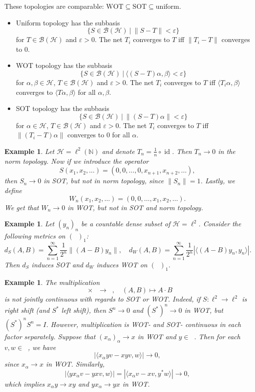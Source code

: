 \documentclass[10pt, a4paper]{article}
\newtheorem{example}[thm]{Example}
\newcommand{\N}{\mathbb {N}}
\DeclareMathOperator{\id}{id}
\DeclareMathOperator{\bh}{\mathcal{B} (\mathcal{H})}
\begin{document}
These topologies are comparable: $\mathrm{WOT} \subseteq \mathrm{SOT} \subseteq \mathrm{uniform}$.
\begin{itemize}
  \item Uniform topology has the subbasis $$\{S \in \mathcal{B}(\mathcal{H})\ |\ \| S - T\| < \varepsilon \}$$
for $T \in \mathcal{B}(\mathcal{H})$ and $\varepsilon > 0$. The net $T_i$ converges to $T$ iff $\| T_i - T\|$ converges to $0$.
  \item WOT topology has the subbasis $$\{S \in \mathcal{B}(\mathcal{H})\ |\ \langle (S - T) \alpha, \beta \rangle < \varepsilon \}$$
  for $\alpha, \beta \in \mathcal{H}$, $T \in \mathcal{B}(\mathcal{H})$ and $\varepsilon > 0$. The net $T_i$ converges to $T$ iff $\langle T_i \alpha, \beta \rangle$ converges to $\langle T \alpha, \beta \rangle$ for all $\alpha, \beta$.
  \item SOT topology has the subbasis $$\{S \in \mathcal{B}(\mathcal{H})\ |\ \| (S - T) \alpha\| < \varepsilon \}$$
  for $\alpha \in \mathcal{H}$, $T \in \mathcal{B}(\mathcal{H})$ and $\varepsilon > 0$. The net $T_i$ converges to $T$ iff $\| (T_i - T)\alpha \|$ converges to $0$ for all $\alpha$.
\end{itemize}

\begin{example}
  Let $\mathcal{H} = \ell^2 (\N)$ and denote $T_n = \frac{1}{n} \circ \id$.
  Then $T_n \to 0$ in the norm topology. Now if we introduce the operator
  $$S (x_1, x_2, \dots) = (0, 0, \dots, 0, x_{n + 1}, x_{n + 2}, \dots),$$
  then $S_n \to 0$ in SOT, but not in norm topology, since $\|S_n\| = 1$.
  Lastly, we define 
  $$W_n (x_1, x_2, \dots) = (0, 0, \dots, x_1, x_2, \dots).$$
  We get that $W_n \to 0$ in WOT, but not in SOT and norm topology.
\end{example}

\begin{example}
  Let $(y_n)_n$ be a countable dense subset of $\mathcal{H} = \ell^2$.
  Consider the following metrics on $(\bh)_1$:
  $$d_S (A, B) = \sum_{n = 1} ^\infty \frac{1}{2^n} \|(A - B) {y_n}\|,\quad d_W (A, B) = \sum_{n = 1} ^\infty \frac{1}{2^n} \left|\langle(A - B) {y_n} , y_n\rangle\right|.$$
  Then $d_S$ induces SOT and $d_W$ induces WOT on $(\bh)_1$.
\end{example}

\begin{example}
  The multiplication 
  $$\bh \times \bh \to \bh,\quad (A, B) \mapsto A \cdot B$$
  is not jointly continuous with regards to SOT or WOT. Indeed, if $S: \ell^2 \to \ell^2$ is right shift (and $S^*$ left shift),
  then $S^n \to 0$ and $(S^*)^n \to 0$ in WOT, but $(S^*)^n S^n = I$. However,
  multiplication is WOT- and SOT- continuous in each factor separately.
  Suppose that $(x_\alpha)_\alpha \to x$ in WOT and $y \in \bh$.
  Then for each $v, w \in \bh$, we have 
  $$|\langle x_\alpha yv - xyv, w \rangle | \to 0,$$
  since $x_\alpha \to x$ in WOT. Similarly,
  $$|\langle y x_\alpha v - yxv, w \rangle | = |\langle  x_\alpha v - xv, y^*w \rangle | \to 0,$$
  which implies $x_\alpha y \to xy$ and $y x_\alpha \to yx$ in WOT.
\end{example}
\end{document}
